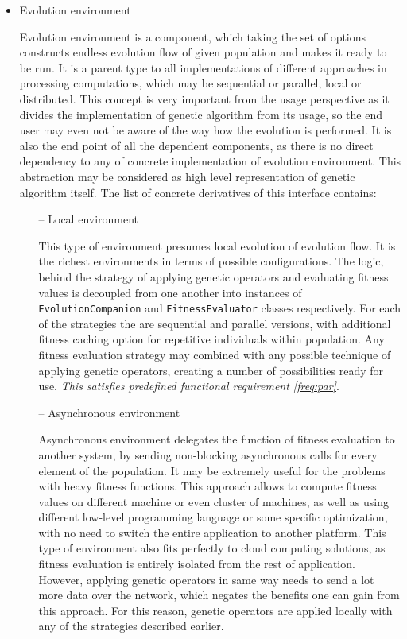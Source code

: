 \begin{itemize}
\item
Evolution environment

Evolution environment is a component, which taking the set of options constructs endless evolution flow of given population and makes it ready to be run. It is a parent type to all implementations of different approaches in processing computations, which may be sequential or parallel, local or distributed. This concept is very important from the usage perspective as it divides the implementation of genetic algorithm from its usage, so the end user may even not be aware of the way how the evolution is performed. It is also the end point of all the dependent components, as there is no direct dependency to any of concrete implementation of evolution environment. This abstraction may be considered as high level representation of genetic algorithm itself. The list of concrete derivatives of this interface contains:
\begin{itemize}
\item[--]
Local environment

This type of environment presumes local evolution of evolution flow. It is the richest environments in terms of possible configurations. The logic, behind the strategy of applying genetic operators and evaluating fitness values is decoupled from one another into instances of \texttt{EvolutionCompanion} and \texttt{FitnessEvaluator} classes respectively. For each of the strategies the are sequential and parallel versions, with additional fitness caching option for repetitive individuals within population. Any fitness evaluation strategy may combined with any possible technique of applying genetic operators, creating a number of possibilities ready for use.
\smallskip\textit{This satisfies predefined functional requirement \ref{freq:par}}.
\medbreak

\item[--]
Asynchronous environment

Asynchronous environment delegates the function of fitness evaluation to another system, by sending non-blocking asynchronous calls for every element of the population. It may be extremely useful for the problems with heavy fitness functions. This approach allows to compute fitness values on different machine or even cluster of machines, as well as using different low-level programming language or some specific optimization, with no need to switch the entire application to another platform. This type of environment also fits perfectly to cloud computing solutions, as fitness evaluation is entirely isolated from the rest of application. However, applying genetic operators in same way needs to send a lot more data over the network, which negates the benefits one can gain from this approach. For this reason, genetic operators are applied locally with any of the strategies described earlier.


\end{itemize}
\end{itemize}
